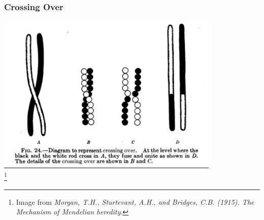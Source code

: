 \documentclass{beamer}
\newcommand\blfootnote[1]{%
	\begingroup
	\renewcommand\thefootnote{}\footnote{#1}%
	\addtocounter{footnote}{-1}%
	\endgroup
}
\begin{document}
\begin{frame}
	\frametitle{Crossing Over}
	
	\centering			\includegraphics[keepaspectratio, width  =0.8\textwidth]{img/MorganCrossover} \\

	
	\blfootnote{Image from \textit{Morgan, T.H., Sturtevant, A.H., and Bridges, C.B. (1915). The Mechanism of Mendelian heredity}.}
	
	
\end{frame}		
		
\end{document}
